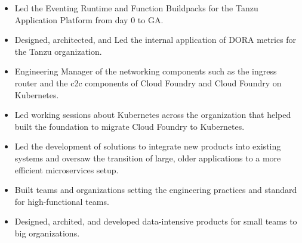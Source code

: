 \documentclass[10pt,a4paper,ragged2e,withhyper]{altacv}
\begin{document}
\begin{paracol}{2}


\begin{itemize}
    \item Led the Eventing Runtime and Function Buildpacks for the Tanzu Application Platform from day 0 to GA.
    \item Designed, architected, and Led the internal application of DORA metrics for the Tanzu organization.
\end{itemize}
\divider

\begin{itemize}
    \item Engineering Manager of the networking components such as the ingress router and the c2c components of Cloud Foundry and Cloud Foundry on Kubernetes.
    \item Led working sessions about Kubernetes across the organization that helped built the foundation to migrate Cloud Foundry to Kubernetes.
\end{itemize}

\divider

\begin{itemize}
    \item Led the development of solutions to integrate new products into existing systems and oversaw the transition of large, older applications to a more efficient microservices setup.
    \item Built teams and organizations setting the engineering practices and standard for high-functional teams.
\end{itemize}

\divider

\begin{itemize}
    \item Designed, archited, and developed data-intensive products for small teams to big organizations.
\end{itemize}

\medskip


\switchcolumn


\end{paracol}
\end{document}
